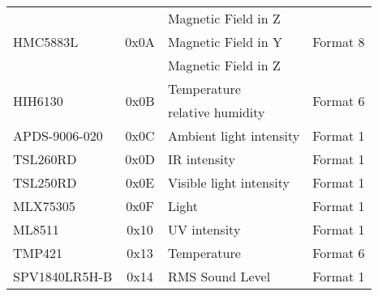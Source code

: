 \begin{center}
\begin{longtable}{|l|c|>{\centering}p{}|l|}
    \rowcolor{black!8} \multicolumn{4}{|c|}{{Lightsense board}} \\ \hline
        \multirow{3}{*}{HMC5883L} & \multirow{3}{*}{0x0A} & Magnetic Field in Z & \multirow{3}{*}{Format 8}\\ \cline{3-3}
        & & Magnetic Field in Y & \\ \cline{3-3}
        & & Magnetic Field in Z & \\ \hline
        \multirow{2}{*}{HIH6130} & \multirow{2}{*}{0x0B} & Temperature & \multirow{2}{*}{Format 6}\\ \cline{3-3}
        & & relative humidity & \\ \hline
        APDS-9006-020 & 0x0C & Ambient light intensity & Format 1\\ \hline
        TSL260RD & 0x0D & IR intensity & Format 1\\ \hline
        TSL250RD & 0x0E & Visible light intensity & Format 1\\ \hline
        MLX75305 & 0x0F & Light & Format 1\\ \hline 
        ML8511 & 0x10 & UV intensity & Format 1\\ \hline
        TMP421 & 0x13 & Temperature & Format 6\\ \hline
        SPV1840LR5H-B & 0x14 & RMS Sound Level & Format 1\\ \hline


\end{longtable}
\end{center}
